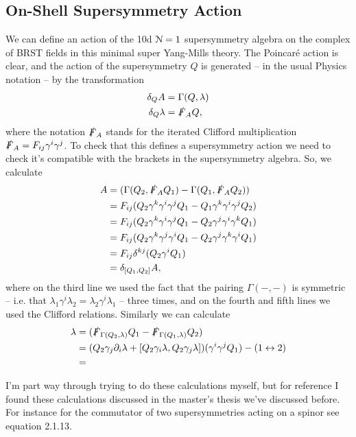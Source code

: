\documentclass[10pt, oneside]{article}
\begin{document}
\subsection{On-Shell Supersymmetry Action}
We can define an action of the 10d $\mathcal{N}=1$ supersymmetry algebra on the complex of BRST fields in this minimal super Yang-Mills theory.  The Poincar\'e action is clear, and the action of the supersymmetry $Q$ is generated -- in the usual Physics notation -- by the transformation \cite{BrinkSchwarzScherk}
\begin{align*}
\delta_Q A &= \Gamma(Q,\lambda) \\
\delta_Q \lambda &= \slashed{F}_A Q,
\end{align*}
where the notation $\slashed{F}_A$ stands for the iterated Clifford multiplication $\slashed{F}_A = F_{ij} \gamma^i \gamma^j$.  To check that this defines a supersymmetry action we need to check it's compatible with the brackets in the supersymmetry algebra.  So, we calculate
\begin{align*}
[\delta_{Q_1}, \delta_{Q_2}] A &= (\Gamma(Q_2,\sd F_A Q_1) - \Gamma(Q_1,\sd F_A Q_2)) \\
&=  F_{ij}(Q_2 \gamma^k \gamma^i \gamma^j Q_1 - Q_1 \gamma^k \gamma^i \gamma^j Q_2)\\
&=  F_{ij}(Q_2 \gamma^k \gamma^i \gamma^j Q_1 - Q_2 \gamma^j \gamma^i \gamma^k Q_1)\\
&=  F_{ij}(Q_2 \gamma^k \gamma^j \gamma^i Q_1 - Q_2 \gamma^j \gamma^k \gamma^i Q_1)\\
&=  F_{ij}\delta^{kj}(Q_2 \gamma^i Q_1) \\
&= \delta_{[Q_1, Q_2]} A,
\end{align*}
where on the third line we used the fact that the pairing $\Gamma(-,-)$ is symmetric -- i.e. that $\lambda_1 \gamma^i \lambda_2 = \lambda_2 \gamma^i \lambda_1$ -- three times, and on the fourth and fifth lines we used the Clifford relations.  Similarly we can calculate
\begin{align*}
[\delta_{Q_1}, \delta_{Q_2}] \lambda &= (\sd F_{\Gamma(Q_2, \lambda)} Q_1 - \sd F_{\Gamma(Q_1,\lambda)} Q_2) \\
&= (Q_2 \gamma_j \dd_i \lambda + [Q_2\gamma_i \lambda, Q_2 \gamma_j \lambda]) (\gamma^i \gamma^j Q_1) - (1 \leftrightarrow 2) \\
&= 
\end{align*}

\begin{remark}
I'm part way through trying to do these calculations myself, but for reference I found these calculations discussed in the master's thesis \cite{Guillen} we've discussed before.  For instance for the commutator of two supersymmetries acting on a spinor see equation 2.1.13.
\end{remark}
\end{document}
